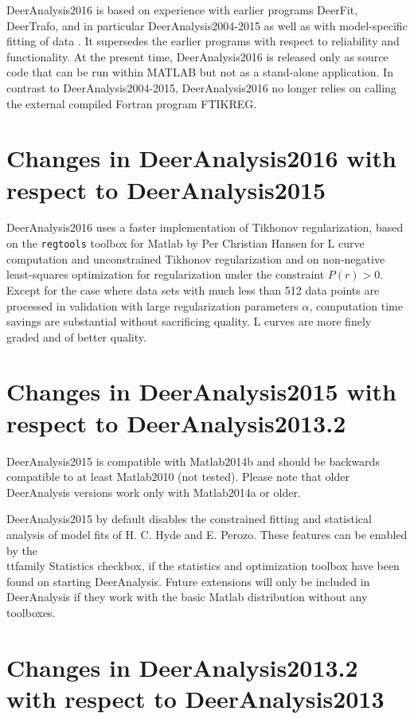 \documentclass{article}
\begin{document}
DeerAnalysis2016 is based on experience with earlier programs DeerFit, DeerTrafo, and in particular DeerAnalysis2004-2015 as well as with model-specific fitting of data \cite{jeschke2003b,hinderbe2004,godt2006}. It supersedes the earlier programs with respect to reliability and functionality. At the present time, DeerAnalysis2016 is released only as source code that can be run within MATLAB but not as a stand-alone application. In contrast to DeerAnalysis2004-2015, DeerAnalysis2016 no longer relies on calling the external compiled Fortran program FTIKREG.

\section{Changes in DeerAnalysis2016 with respect to DeerAnalysis2015}
\label{changes_2016}

DeerAnalysis2016 uses a faster implementation of Tikhonov regularization, based on the \texttt{regtools} toolbox for Matlab by Per Christian Hansen for L curve computation and unconstrained Tikhonov regularization and on non-negative least-squares optimization for regularization under the constraint $P(r) > 0$. Except for the case where data sets with much less than 512 data points are processed in validation with large regularization parameters $\alpha$, computation time savings are substantial without sacrificing quality. L curves are more finely graded and of better quality. 

\section{Changes in DeerAnalysis2015 with respect to DeerAnalysis2013.2}
\label{changes_2015}

DeerAnalysis2015 is compatible with Matlab2014b and should be backwards compatible to at least Matlab2010 (not tested). Please note that older DeerAnalysis versions work only with Matlab2014a or older. 

DeerAnalysis2015 by default disables the constrained fitting and statistical analysis of model fits of H. C. Hyde and E. Perozo. These features can be enabled by the {\\ttfamily Statistics} checkbox, if the statistics and optimization toolbox have been found on starting DeerAnalysis. Future extensions will only be included in DeerAnalysis if they work with the basic Matlab distribution without any toolboxes.

\section{Changes in DeerAnalysis2013.2 with respect to DeerAnalysis2013}
\label{changes_2013b}
\end{document}
